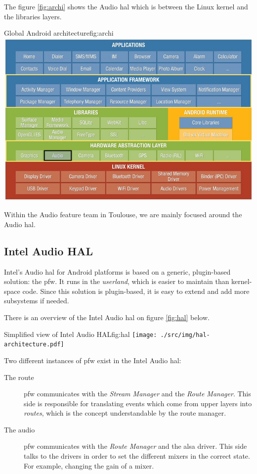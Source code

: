 The figure \ref{fig:archi} shows the Audio \gls{hal} which is between the
Linux \gls{kernel} and the libraries layers.
\begin{figureGraphics}{Global Android architecture}{fig:archi}
    \includegraphics[width=\textwidth]{./src/img/android-archi-audio-hal.jpeg}
\end{figureGraphics}

Within the Audio feature team in Toulouse, we are mainly focused around the Audio \gls{hal}.

\subsection{Intel Audio HAL}
Intel's Audio \gls{hal} for Android platforms is based on a generic, plugin-based solution: the \gls{pfw}.
It runs in the \emph{userland}, which is easier to maintain than kernel-space code.
Since this solution is plugin-based, it is easy to extend and add more subsystems if needed.

There is an overview of the Intel Audio \gls{hal} on figure \ref{fig:hal} below.
\begin{figureGraphics}{Simplified view of Intel Audio HAL}{fig:hal}
    \texttt{[image: ./src/img/hal-architecture.pdf]}
\end{figureGraphics}
Two different instances of \gls{pfw} exist in the Intel Audio \gls{hal}:
\begin{description}
    \item[The route] \gls{pfw} communicates with the \emph{Stream Manager} and the \emph{Route Manager}.
        This side is responsible for translating events which come from upper layers into \emph{routes}, which
        is the concept understandable by the route manager.
    \item[The audio] \gls{pfw} communicates with the \emph{Route Manager} and the \gls{alsa} driver.
        This side talks to the drivers in order to set the different mixers in the correct state. For example,
        changing the gain of a mixer.
\end{description}


